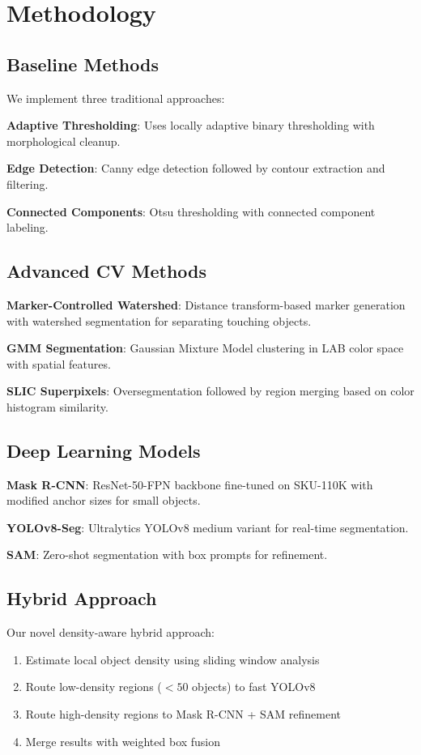 \documentclass[conference]{IEEEtran}
\begin{document}
\section{Methodology}

\subsection{Baseline Methods}

We implement three traditional approaches:

\textbf{Adaptive Thresholding}: Uses locally adaptive binary thresholding with morphological cleanup.

\textbf{Edge Detection}: Canny edge detection followed by contour extraction and filtering.

\textbf{Connected Components}: Otsu thresholding with connected component labeling.

\subsection{Advanced CV Methods}

\textbf{Marker-Controlled Watershed}: Distance transform-based marker generation with watershed segmentation for separating touching objects.

\textbf{GMM Segmentation}: Gaussian Mixture Model clustering in LAB color space with spatial features.

\textbf{SLIC Superpixels}: Oversegmentation followed by region merging based on color histogram similarity.

\subsection{Deep Learning Models}

\textbf{Mask R-CNN}: ResNet-50-FPN backbone fine-tuned on SKU-110K with modified anchor sizes for small objects.

\textbf{YOLOv8-Seg}: Ultralytics YOLOv8 medium variant for real-time segmentation.

\textbf{SAM}: Zero-shot segmentation with box prompts for refinement.

\subsection{Hybrid Approach}

Our novel density-aware hybrid approach:

\begin{enumerate}
    \item Estimate local object density using sliding window analysis
    \item Route low-density regions ($<50$ objects) to fast YOLOv8
    \item Route high-density regions to Mask R-CNN + SAM refinement
    \item Merge results with weighted box fusion
\end{enumerate}
\end{document}
